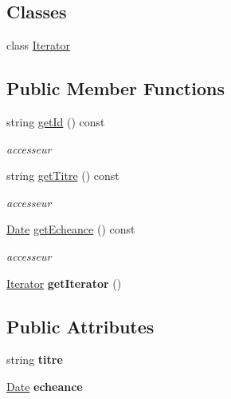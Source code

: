 \subsection*{Classes}
\begin{DoxyCompactItemize}
\item 
class \hyperlink{class_tache_1_1_iterator}{Iterator}
\end{DoxyCompactItemize}
\subsection*{Public Member Functions}
\begin{DoxyCompactItemize}
\item 
\hypertarget{class_tache_a1fe8754733f0b85c232d91851cf61891}{}string \hyperlink{class_tache_a1fe8754733f0b85c232d91851cf61891}{get\+Id} () const \label{class_tache_a1fe8754733f0b85c232d91851cf61891}

\begin{DoxyCompactList}\small\item\em accesseur \end{DoxyCompactList}\item 
\hypertarget{class_tache_ab6af5354e29498ab43ab3cc826b0aac4}{}string \hyperlink{class_tache_ab6af5354e29498ab43ab3cc826b0aac4}{get\+Titre} () const \label{class_tache_ab6af5354e29498ab43ab3cc826b0aac4}

\begin{DoxyCompactList}\small\item\em accesseur \end{DoxyCompactList}\item 
\hypertarget{class_tache_aa7638675a65b3ef3c57a07260f914fae}{}\hyperlink{class_t_i_m_e_1_1_date}{Date} \hyperlink{class_tache_aa7638675a65b3ef3c57a07260f914fae}{get\+Echeance} () const \label{class_tache_aa7638675a65b3ef3c57a07260f914fae}

\begin{DoxyCompactList}\small\item\em accesseur \end{DoxyCompactList}\item 
\hypertarget{class_tache_a709d4d7d5c25604b6e9a5c37b74fa4a6}{}\hyperlink{class_tache_1_1_iterator}{Iterator} {\bfseries get\+Iterator} ()\label{class_tache_a709d4d7d5c25604b6e9a5c37b74fa4a6}

\end{DoxyCompactItemize}
\subsection*{Public Attributes}
\begin{DoxyCompactItemize}
\item 
\hypertarget{class_tache_a874e819401eeca991bcadbbd6de7fdb2}{}string {\bfseries titre}\label{class_tache_a874e819401eeca991bcadbbd6de7fdb2}

\item 
\hypertarget{class_tache_ab82c1297c111c406c1408c68631a9c22}{}\hyperlink{class_t_i_m_e_1_1_date}{Date} {\bfseries echeance}\label{class_tache_ab82c1297c111c406c1408c68631a9c22}

\end{DoxyCompactItemize}
